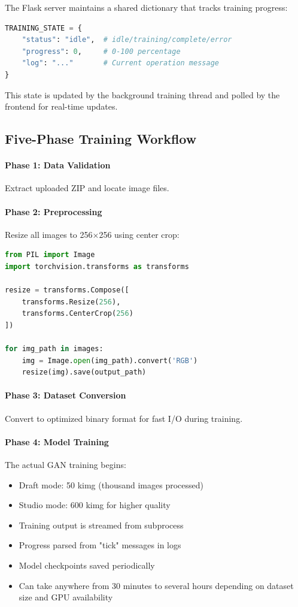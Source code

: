 \documentclass[11pt,a4paper]{article}
\begin{document}
The Flask server maintains a shared dictionary that tracks training progress:
\begin{lstlisting}[language=Python]
TRAINING_STATE = {
    "status": "idle",  # idle/training/complete/error
    "progress": 0,     # 0-100 percentage
    "log": "..."       # Current operation message
}
\end{lstlisting}

This state is updated by the background training thread and polled by the frontend for real-time updates.

\subsection{Five-Phase Training Workflow}

\paragraph{Phase 1: Data Validation} Extract uploaded ZIP and locate image files.

\paragraph{Phase 2: Preprocessing} Resize all images to 256×256 using center crop:
\begin{lstlisting}[language=Python]
from PIL import Image
import torchvision.transforms as transforms

resize = transforms.Compose([
    transforms.Resize(256),
    transforms.CenterCrop(256)
])

for img_path in images:
    img = Image.open(img_path).convert('RGB')
    resize(img).save(output_path)
\end{lstlisting}

\paragraph{Phase 3: Dataset Conversion} Convert to optimized binary format for fast I/O during training.

\paragraph{Phase 4: Model Training} The actual GAN training begins:
\begin{itemize}[noitemsep]
    \item Draft mode: 50 kimg (thousand images processed)
    \item Studio mode: 600 kimg for higher quality
    \item Training output is streamed from subprocess
    \item Progress parsed from "tick" messages in logs
    \item Model checkpoints saved periodically
    \item Can take anywhere from 30 minutes to several hours depending on dataset size and GPU availability
\end{itemize}
\end{document}
